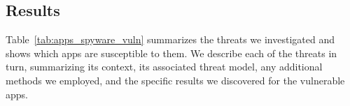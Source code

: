 \documentclass[sigconf,balance=false]{acmart}
\newcommand{\geoff}[1]{\textcolor{purple}{\noindent[GV: #1]}}
\newcommand{\geoff}[1]{}
\begin{document}

\subsection{Results}

Table~\ref{tab:apps_spyware_vuln} summarizes the threats we
investigated and shows which apps are susceptible to them.
%
We describe each of the threats in turn, summarizing its context, its
associated threat model, any additional methods we employed, and the
specific results we discovered for the vulnerable apps.



\end{document}
